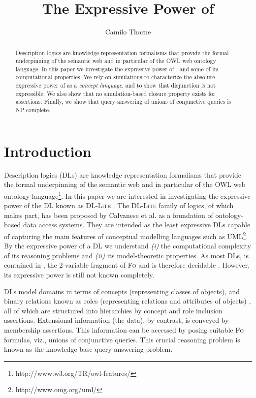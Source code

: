 \documentclass[11pt]{llncs}
\title{The Expressive Power of }
\author{
Camilo Thorne
}
\institute{
\begin{tabular}{c}
IBM CAS Trento - Trento RISE\\
Piazza Manci 17\\
38123, Povo di Trento (Italy)\\
{\tt c.thorne.email@trentorise.eu}
\end{tabular}
}
\newcommand{\logic}[1]{\textsc{#1}\xspace}
\newcommand{\FOL}{\logic{Fo}}
\newcommand{\g}[1]{\logic{#1}}
\newcommand{\NP}{\textsc{NP}\xspace}
\begin{document}
\maketitle



\begin{abstract}
Description logics are knowledge representation formalisms
that provide the formal underpinning of the semantic 
web and in particular of the OWL web ontology language.
In this paper we investigate the
expressive power of , and some of
its computational properties. We rely on simulations
to characterize the absolute expressive power of 
as a {\em concept language}, and to show that disjunction is not expressible.
We also show that no simulation-based closure property exists
for  assertions. Finally, we show
that query answering of unions of conjunctive queries is
\NP-complete.
\end{abstract}

\section{Introduction}\label{intro}


Description logics (DLs) are knowledge representation formalisms
that provide the formal underpinning of the semantic 
web and in particular of the OWL web ontology language\footnote{http://www.w3.org/TR/owl-features/}.
In this paper we are interested in investigating the
expressive power of the DL known as \g{DL-Lite}
\cite{Calvanese2006B}. The \g{DL-Lite} family of logics, of which
 makes part,
has been proposed by Calvanese et al. as a foundation of
ontology-based data access systems. They are intended
\cite{Calvanese2005A,Calvanese2007D}
as the least expressive DLs capable of capturing the main
features of conceptual modelling languages such as UML\footnote{http://www.omg.org/uml/}.
By the expressive power of a DL we understand
\textit{(i)} the
computational complexity of its reasoning problems
and \textit{(ii)} its model-theoretic properties.
As most DLs,  
is contained in , the 2-variable
fragment of \FOL and is therefore decidable
\cite{Borgida1996,Hudstadt2004,DLHandbook}. However,
its expressive power is still not known completely.

DLs model
domains in terms
of concepts (representing classes of objects), 
and binary relations known as roles (representing relations and
attributes of objects) \cite{DLHandbook}, all of which
are structured
into hierarchies by concept and role inclusion assertions.
Extensional information (the data), by contrast,
is conveyed by membership assertions. 
This information can be accessed by posing suitable \FOL
formulas, viz., unions of conjunctive queries.
This crucial reasoning problem is known as the knowledge
base query answering problem.
\end{document}
